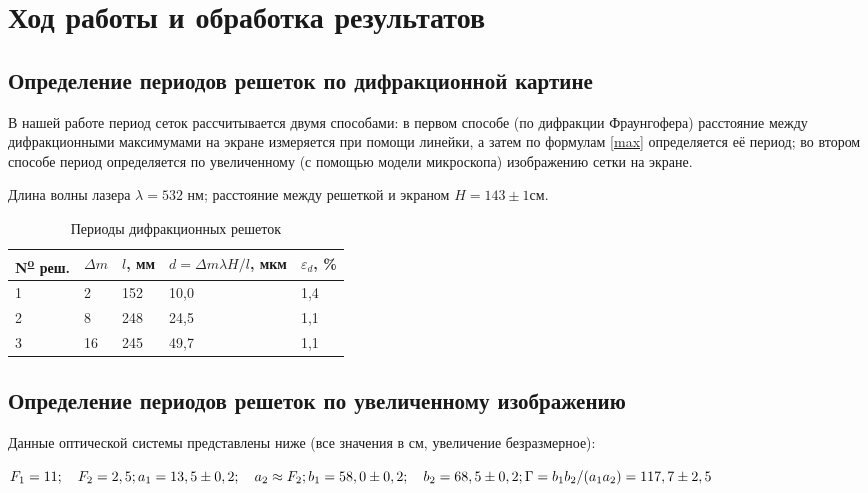 \documentclass[a4paper,12pt]{article} %
\begin{document}
\section{Ход работы и обработка результатов}

\subsection{Определение периодов решеток по дифракционной картине}

В нашей работе период сеток рассчитывается двумя способами: в первом способе (по дифракции Фраунгофера) расстояние между дифракционными максимумами на экране измеряется при помощи линейки, а затем по формулам \eqref{max} определяется её период; во втором способе период определяется по увеличенному (с помощью модели микроскопа) изображению сетки на экране.

Длина волны лазера $\lambda = 532$ нм; расстояние между решеткой и экраном $H = 143\pm 1$см.


\begin{table}[H]
    \centering
    \begin{tabular}{|p{2cm}|l|p{2cm}|l|l|}
        \hline N\textsuperscript{\underline{o}} реш. & $\Delta m$ & $l$, мм & $\displaystyle d= \Delta m \lambda H/l$, мкм & $\varepsilon_d$, \% \\ \hline
         1&2 & 152 & 10,0 & 1,4 \\ \hline
         2&8 & 248 & 24,5 & 1,1 \\ \hline
         3&16& 245 & 49,7 & 1,1 \\ \hline
    \end{tabular}
    \caption{Периоды дифракционных решеток}
    \label{d}
\end{table}

\subsection{Определение периодов решеток по увеличенному изображению}

Данные оптической системы представлены ниже (все значения в см, увеличение безразмерное):

\begin{center}
    $
    F_1 = 11; \ \ \ F_2 = 2,5;\\
    a_1 = 13,5 \pm 0,2; \ \ \ a_2 \approx F_2;\\
    b_1 = 58,0 \pm 0,2; \ \ \ b_2 = 68,5 \pm 0,2;\\
    \Gamma = b_1 b_2/(a_1 a_2) = 117,7 \pm 2,5
    $
\end{center}
\end{document}
